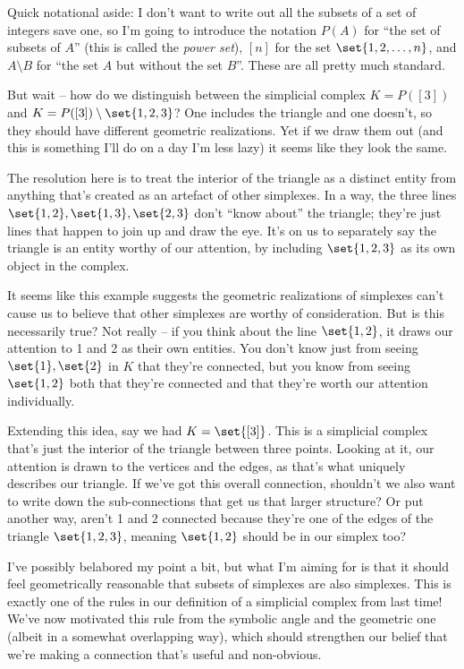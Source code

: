 \documentclass{lec}
\begin{document}
    {\color{blue} Quick notational aside: I don't want to write out all the subsets of a set of integers save one, so I'm going to introduce the notation $P(A)$ for ``the set of subsets of $A$'' (this is called the \textit{power set}), $[n]$ for the set $\set{1, 2, \dots, n}$, and $A \setminus B$ for ``the set $A$ but without the set $B$''. These are all pretty much standard.}

    But wait -- how do we distinguish between the simplicial complex $K = P([3])$ and $K = P([3]) \setminus \set{1, 2, 3}$? One includes the triangle and one doesn't, so they should have different geometric realizations. Yet if we draw them out (and this is something I'll do on a day I'm less lazy) it seems like they look the same.

    The resolution here is to treat the interior of the triangle as a distinct entity from anything that's created as an artefact of other simplexes. In a way, the three lines $\set{1, 2}, \set{1, 3}, \set{2, 3}$ don't ``know about'' the triangle; they're just lines that happen to join up and draw the eye. It's on us to separately say the triangle is an entity worthy of our attention, by including $\set{1, 2, 3}$ as its own object in the complex. 

    It seems like this example suggests the geometric realizations of simplexes can't cause us to believe that other simplexes are worthy of consideration. But is this necessarily true? Not really -- if you think about the line $\set{1, 2}$, it draws our attention to 1 and 2 as their own entities. You don't know just from seeing $\set{1}, \set{2}$ in $K$ that they're connected, but you know from seeing $\set{1, 2}$ both that they're connected and that they're worth our attention individually. 
    
    Extending this idea, say we had $K = \set{[3]}$. This is a simplicial complex that's just the interior of the triangle between three points. Looking at it, our attention is drawn to the vertices and the edges, as that's what uniquely describes our triangle. If we've got this overall connection, shouldn't we also want to write down the sub-connections that get us that larger structure? Or put another way, aren't 1 and 2 connected because they're one of the edges of the triangle $\set{1, 2, 3}$, meaning $\set{1, 2}$ should be in our simplex too?

    I've possibly belabored my point a bit, but what I'm aiming for is that it should feel geometrically reasonable that subsets of simplexes are also simplexes. This is exactly one of the rules in our definition of a simplicial complex from last time! We've now motivated this rule from the symbolic angle and the geometric one (albeit in a somewhat overlapping way), which should strengthen our belief that we're making a connection that's useful and non-obvious. 
\end{document}

